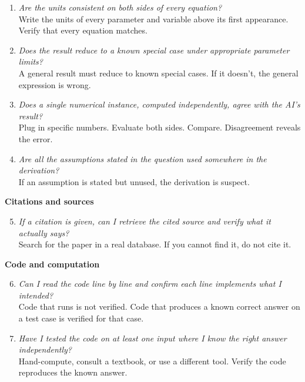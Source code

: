 \documentclass[11pt]{book}
\begin{document}
\begin{enumerate}\setlength{\itemsep}{4pt}
\item \emph{Are the units consistent on both sides of every equation?}\\
Write the units of every parameter and variable above its first appearance. Verify that every equation matches.

\item \emph{Does the result reduce to a known special case under appropriate parameter limits?}\\
A general result must reduce to known special cases. If it doesn't, the general expression is wrong.

\item \emph{Does a single numerical instance, computed independently, agree with the AI's result?}\\
Plug in specific numbers. Evaluate both sides. Compare. Disagreement reveals the error.

\item \emph{Are all the assumptions stated in the question used somewhere in the derivation?}\\
If an assumption is stated but unused, the derivation is suspect.
\end{enumerate}

\medskip

\noindent \textbf{Citations and sources}

\begin{enumerate}\setcounter{enumi}{4}\setlength{\itemsep}{4pt}
\item \emph{If a citation is given, can I retrieve the cited source and verify what it actually says?}\\
Search for the paper in a real database. If you cannot find it, do not cite it.
\end{enumerate}

\medskip

\noindent \textbf{Code and computation}

\begin{enumerate}\setcounter{enumi}{5}\setlength{\itemsep}{4pt}
\item \emph{Can I read the code line by line and confirm each line implements what I intended?}\\
Code that runs is not verified. Code that produces a known correct answer on a test case is verified for that case.

\item \emph{Have I tested the code on at least one input where I know the right answer independently?}\\
Hand-compute, consult a textbook, or use a different tool. Verify the code reproduces the known answer.
\end{enumerate}
\end{document}
